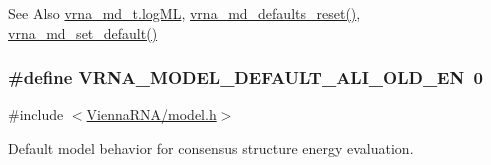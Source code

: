 \begin{DoxySeeAlso}{See Also}
\hyperlink{group__model__details_ae259f89a94acae0c7f1412603e7f57b5}{vrna\-\_\-md\-\_\-t.\-log\-M\-L}, \hyperlink{group__model__details_ga70834424cf804d149937de89f80ceb45}{vrna\-\_\-md\-\_\-defaults\-\_\-reset()}, \hyperlink{group__model__details_ga8ac6ff84936282436f822644bf841f66}{vrna\-\_\-md\-\_\-set\-\_\-default()} 
\end{DoxySeeAlso}
\hypertarget{group__model__details_ga2a5bbfc1edf33077e39466d2d9807115}{
\subsubsection[{V\-R\-N\-A\-\_\-\-M\-O\-D\-E\-L\-\_\-\-D\-E\-F\-A\-U\-L\-T\-\_\-\-A\-L\-I\-\_\-\-O\-L\-D\-\_\-\-E\-N}]{\setlength{\rightskip}{0pt plus 5cm}\#define V\-R\-N\-A\-\_\-\-M\-O\-D\-E\-L\-\_\-\-D\-E\-F\-A\-U\-L\-T\-\_\-\-A\-L\-I\-\_\-\-O\-L\-D\-\_\-\-E\-N~0}}\label{group__model__details_ga2a5bbfc1edf33077e39466d2d9807115}


{\ttfamily \#include $<$\hyperlink{model_8h}{Vienna\-R\-N\-A/model.\-h}$>$}



Default model behavior for consensus structure energy evaluation. 

